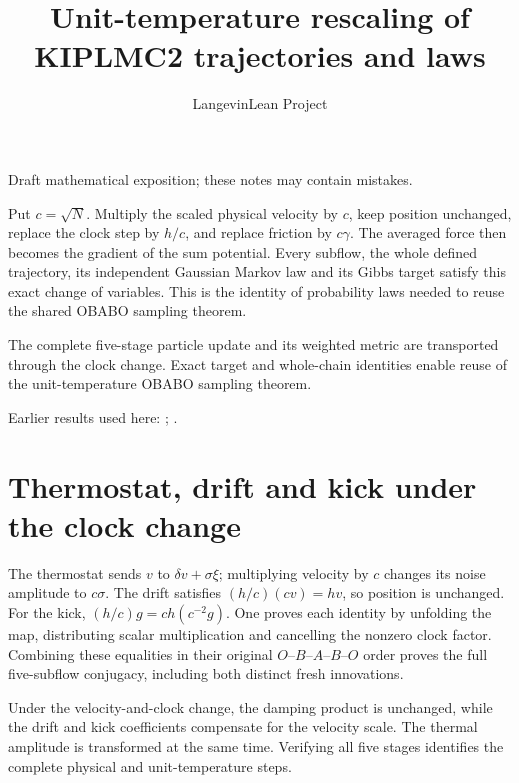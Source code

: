 \documentclass[11pt,a4paper]{article}
\title{\texorpdfstring{Unit-temperature rescaling of KIPLMC2 trajectories and laws}{Unit-temperature rescaling of KIPLMC2 trajectories and laws}}
\author{LangevinLean Project}
\date{}
\begin{document}
\maketitle
Draft mathematical exposition; these notes may contain mistakes.


Put \(c=\sqrt N\). Multiply the scaled physical velocity by \(c\), keep position unchanged, replace the clock step by \(h/c\), and replace friction by \(c\gamma\). The averaged force then becomes the gradient of the sum potential. Every subflow, the whole defined trajectory, its independent Gaussian Markov law and its Gibbs target satisfy this exact change of variables. This is the identity of probability laws needed to reuse the shared OBABO sampling theorem.



The complete five-stage particle update and its weighted metric are transported through the clock change. Exact target and whole-chain identities enable reuse of the unit-temperature OBABO sampling theorem.



Earlier results used here: \cite[Section~3.51]{LangevinLean2026Kinetic}; \cite[Section~3.113]{LangevinLean2026Kinetic}.

\section{\texorpdfstring{Thermostat, drift and kick under the clock change}{Thermostat, drift and kick under the clock change}}


The thermostat sends \(v\) to \(\delta v+\sigma\xi\); multiplying velocity by \(c\) changes its noise amplitude to \(c\sigma\). The drift satisfies \((h/c)(cv)=hv\), so position is unchanged. For the kick, \((h/c)g=c h(c^{-2}g)\). One proves each identity by unfolding the map, distributing scalar multiplication and cancelling the nonzero clock factor. Combining these equalities in their original \(O\)–\(B\)–\(A\)–\(B\)–\(O\) order proves the full five-subflow conjugacy, including both distinct fresh innovations.



Under the velocity-and-clock change, the damping product is unchanged, while the drift and kick coefficients compensate for the velocity scale. The thermal amplitude is transformed at the same time. Verifying all five stages identifies the complete physical and unit-temperature steps.
\end{document}

